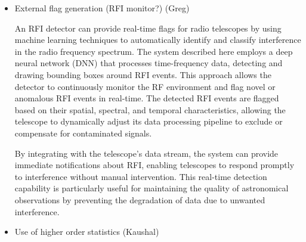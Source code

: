 \begin{itemize}
\item External flag generation (RFI monitor?) (Greg)

An RFI detector can provide real-time flags for radio telescopes by using machine learning techniques to automatically identify and classify interference in the radio frequency spectrum. The system described here \cite{9111666} employs a deep neural network (DNN) that processes time-frequency data, detecting and drawing bounding boxes around RFI events. This approach allows the detector to continuously monitor the RF environment and flag novel or anomalous RFI events in real-time. The detected RFI events are flagged based on their spatial, spectral, and temporal characteristics, allowing the telescope to dynamically adjust its data processing pipeline to exclude or compensate for contaminated signals.

By integrating with the telescope’s data stream, the system can provide immediate notifications about RFI, enabling telescopes to respond promptly to interference without manual intervention. This real-time detection capability is particularly useful for maintaining the quality of astronomical observations by preventing the degradation of data due to unwanted interference.

\item Use of higher order statistics (Kaushal)
\end{itemize}